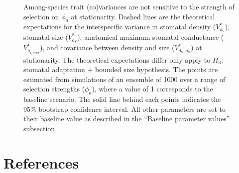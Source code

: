 \documentclass[
  letterpaper,
  DIV=11,
  numbers=noendperiod]{scrartcl}
\begin{document}
\begin{figure}
\caption{Among-species trait (co)variances are not sensitive to the strength of selection on $\phi_a$ at stationarity. Dashed lines are the theoretical expectations for the interspecific variance in stomatal density ($V_{d_\mathrm{S}}^*$), stomatal size ($V_{a_\mathrm{S}}^*$), anatomical maximum stomatal conductance ($V_{g_\mathrm{s,max}}^*$), and covariance between density and size ($V_{d_\mathrm{S},a_\mathrm{S}}^*$) at stationarity. The theoretical expectations differ only apply to $H_3$: stomatal adaptation + bounded size hypothesis. The points are estimated from simulations of an ensemble of 1000 over a range of selection strengths ($\phi_a$), where a value of 1 corresponds to the baseline scenario. The solid line behind each points indicates the 95\% bootstrap confidence interval. All other parameters are set to their baseline value as described in the ``Baseline parameter values'' subsection.}

\end{figure}

\clearpage

\section*{References}\label{references}
\end{document}
